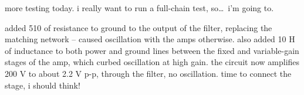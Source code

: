 more testing today. i really want to run a full-chain test, so\dots\ i'm going
to.

added 510 \ohm of resistance to ground to the output of the \ifreq filter,
replacing the matching network -- caused oscillation with the amps otherwise.
also added 10 \textmu H of inductance to both power and ground lines between
the fixed and variable-gain stages of the \ifreq amp, which curbed oscillation
at high gain. the circuit now amplifies 200 \textmu V to about 2.2 V p-p,
through the filter, no oscillation. time to connect the \rf stage, i should
think!
